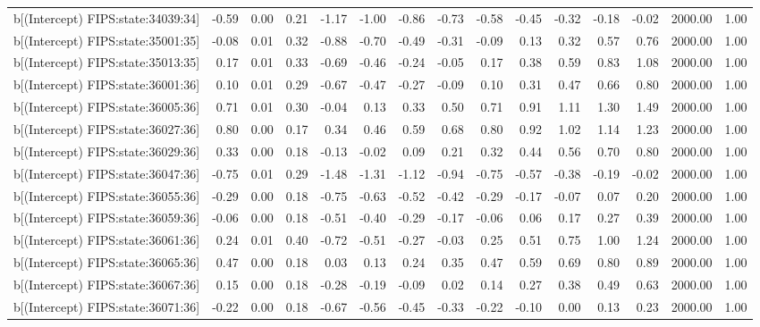 \begin{table}[ht]
\begin{tabular}{rrrrrrrrrrrrrrr}
  b[(Intercept) FIPS:state:34039:34] & -0.59 & 0.00 & 0.21 & -1.17 & -1.00 & -0.86 & -0.73 & -0.58 & -0.45 & -0.32 & -0.18 & -0.02 & 2000.00 & 1.00 \\ 
  b[(Intercept) FIPS:state:35001:35] & -0.08 & 0.01 & 0.32 & -0.88 & -0.70 & -0.49 & -0.31 & -0.09 & 0.13 & 0.32 & 0.57 & 0.76 & 2000.00 & 1.00 \\ 
  b[(Intercept) FIPS:state:35013:35] & 0.17 & 0.01 & 0.33 & -0.69 & -0.46 & -0.24 & -0.05 & 0.17 & 0.38 & 0.59 & 0.83 & 1.08 & 2000.00 & 1.00 \\ 
  b[(Intercept) FIPS:state:36001:36] & 0.10 & 0.01 & 0.29 & -0.67 & -0.47 & -0.27 & -0.09 & 0.10 & 0.31 & 0.47 & 0.66 & 0.80 & 2000.00 & 1.00 \\ 
  b[(Intercept) FIPS:state:36005:36] & 0.71 & 0.01 & 0.30 & -0.04 & 0.13 & 0.33 & 0.50 & 0.71 & 0.91 & 1.11 & 1.30 & 1.49 & 2000.00 & 1.00 \\ 
  b[(Intercept) FIPS:state:36027:36] & 0.80 & 0.00 & 0.17 & 0.34 & 0.46 & 0.59 & 0.68 & 0.80 & 0.92 & 1.02 & 1.14 & 1.23 & 2000.00 & 1.00 \\ 
  b[(Intercept) FIPS:state:36029:36] & 0.33 & 0.00 & 0.18 & -0.13 & -0.02 & 0.09 & 0.21 & 0.32 & 0.44 & 0.56 & 0.70 & 0.80 & 2000.00 & 1.00 \\ 
  b[(Intercept) FIPS:state:36047:36] & -0.75 & 0.01 & 0.29 & -1.48 & -1.31 & -1.12 & -0.94 & -0.75 & -0.57 & -0.38 & -0.19 & -0.02 & 2000.00 & 1.00 \\ 
  b[(Intercept) FIPS:state:36055:36] & -0.29 & 0.00 & 0.18 & -0.75 & -0.63 & -0.52 & -0.42 & -0.29 & -0.17 & -0.07 & 0.07 & 0.20 & 2000.00 & 1.00 \\ 
  b[(Intercept) FIPS:state:36059:36] & -0.06 & 0.00 & 0.18 & -0.51 & -0.40 & -0.29 & -0.17 & -0.06 & 0.06 & 0.17 & 0.27 & 0.39 & 2000.00 & 1.00 \\ 
  b[(Intercept) FIPS:state:36061:36] & 0.24 & 0.01 & 0.40 & -0.72 & -0.51 & -0.27 & -0.03 & 0.25 & 0.51 & 0.75 & 1.00 & 1.24 & 2000.00 & 1.00 \\ 
  b[(Intercept) FIPS:state:36065:36] & 0.47 & 0.00 & 0.18 & 0.03 & 0.13 & 0.24 & 0.35 & 0.47 & 0.59 & 0.69 & 0.80 & 0.89 & 2000.00 & 1.00 \\ 
  b[(Intercept) FIPS:state:36067:36] & 0.15 & 0.00 & 0.18 & -0.28 & -0.19 & -0.09 & 0.02 & 0.14 & 0.27 & 0.38 & 0.49 & 0.63 & 2000.00 & 1.00 \\ 
  b[(Intercept) FIPS:state:36071:36] & -0.22 & 0.00 & 0.18 & -0.67 & -0.56 & -0.45 & -0.33 & -0.22 & -0.10 & 0.00 & 0.13 & 0.23 & 2000.00 & 1.00 \\ 

\end{tabular}
\end{table}
